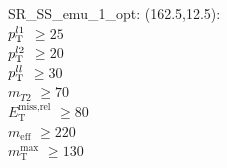 SR\_SS\_emu\_1\_opt: (162.5,12.5): \\
$p_{\text{T}}^{l1}$ $\geq 25$ \\
$p_{\text{T}}^{l2}$ $\geq 20$ \\
$p_{\text{T}}^{ll}$ $\geq 30$ \\
$m_{T2}$ $\geq 70$ \\
$E_{\text{T}}^{\text{miss,rel}}$ $\geq 80$ \\
$m_{\text{eff}}$ $\geq 220$ \\
$m_{\text{T}}^{\text{max}}$ $\geq 130$ \\
